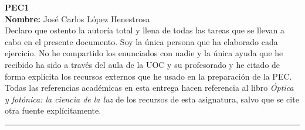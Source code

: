 \documentclass[11pt, a4paper]{article}
\begin{document}
	\begin{center}
		\Large{ \textbf{PEC1} } \\
		\vspace{0.5cm}
		\normalsize{\textbf{Nombre:} José Carlos López Henestrosa} \\
		\vspace{0.5cm}
		\normalsize{Declaro que ostento la autoría total y llena de todas las tareas que se llevan a cabo en el presente documento. Soy la única persona que ha elaborado cada ejercicio. No he compartido los enunciados con nadie y la única ayuda que he recibido ha sido a través del aula de la UOC y su profesorado y he citado de forma explícita los recursos externos que he usado en la preparación de la PEC.} \\
		\vspace{0.5cm}
		\normalsize{Todas las referencias académicas en esta entrega hacen referencia al libro \textit{Óptica y fotónica: la ciencia de la luz} de los recursos de esta asignatura, salvo que se cite otra fuente explícitamente.}
	\end{center}

	\vspace{1cm}
	\hrule
	\vspace{1cm}
\end{document}
